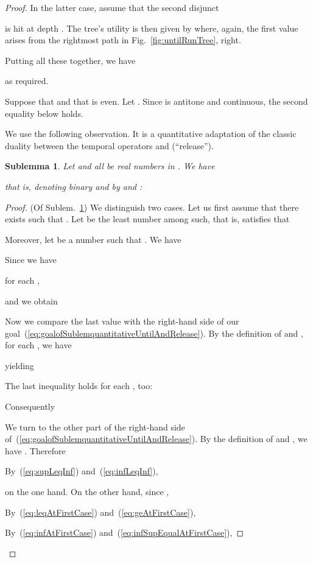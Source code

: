 \documentclass[a4paper,USenglish,numberwithinsect]{lipics}
\theoremstyle{definition}
\theoremstyle{remark}
\theoremstyle{plain}
\newtheorem{sublem}[defi]{Sublemma}
\begin{document}
\begin{proof}
In the latter
 case, assume that the second disjunct 
  
 is hit at depth . The tree's utility is then given by
 where, again, the first value 
 arises
 from the rightmost path in Fig.~\ref{fig:untilRunTree}, right.

Putting all these together, we have

as required.


  Suppose that  and that  is
 even. Let . Since  is antitone and continuous, the second
 equality below holds.
  
  We use the following observation. It is a quantitative adaptation of 
  the classic duality between the temporal operators  and 
 (``release'').
  \begin{sublem}\label{sublem:quantitativeUntilAndRelease}
   Let
 and
  all be real numbers in . We have
  
that is, denoting binary  and  by  and :
  
  \end{sublem}
  \begin{proof} (Of Sublem.~\ref{sublem:quantitativeUntilAndRelease})
   We distinguish two cases. Let us first assume that there exists
    such that .
   Let  be the least number among such, that is,  satisfies that
   
   Moreover, let  be a number such that . 
   We have 
  
  Since we have

 for each ,
  
  and we obtain
  
Now we compare the last value 
   with 
 the right-hand side of our goal~(\ref{eq:goalofSublemquantitativeUntilAndRelease}).
By the definition of  and , for each , we have 
   
yielding

The last inequality holds for each , too:
   
Consequently
   
We turn to the other part 
of the right-hand side of~(\ref{eq:goalofSublemquantitativeUntilAndRelease}).
   By the definition of  and , we have . Therefore
   
   By~(\ref{eq:supLeqInf}) and~(\ref{eq:infLeqInf}), 
   
   on the one hand. 
   On the other hand,  since ,
   
   By~(\ref{eq:leqAtFirstCase}) and~(\ref{eq:geAtFirstCase}), 
   
   By~(\ref{eq:infAtFirstCase}) and~(\ref{eq:infSupEqualAtFirstCase}), 
  

\end{proof}
\end{proof}
\end{document}
